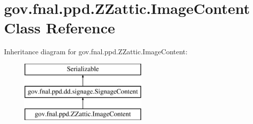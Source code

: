 \hypertarget{classgov_1_1fnal_1_1ppd_1_1ZZattic_1_1ImageContent}{\section{gov.\-fnal.\-ppd.\-Z\-Zattic.\-Image\-Content Class Reference}
\label{classgov_1_1fnal_1_1ppd_1_1ZZattic_1_1ImageContent}
}
Inheritance diagram for gov.\-fnal.\-ppd.\-Z\-Zattic.\-Image\-Content\-:\begin{figure}[H]
\begin{center}
\leavevmode
\includegraphics[height=3.000000cm]{classgov_1_1fnal_1_1ppd_1_1ZZattic_1_1ImageContent}
\end{center}
\end{figure}
